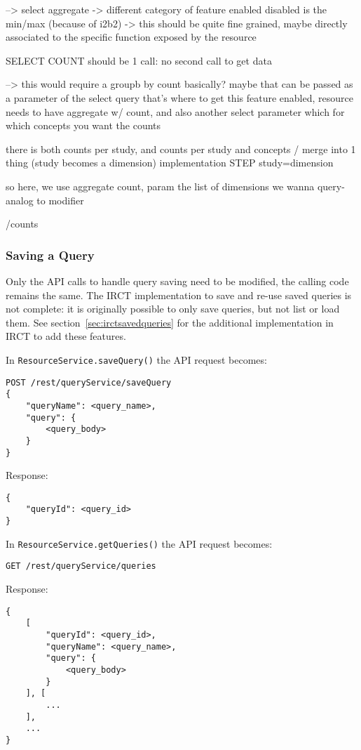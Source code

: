 --> select aggregate
-> different category of feature enabled disabled is the min/max (because of i2b2) -> this should be quite fine grained, maybe directly associated to the specific function exposed by the resource

SELECT COUNT should be 1 call: no second call to get data

--> this would require a groupb by count basically? maybe that can be passed as a parameter of the select query
that's where to get this feature enabled, resource needs to have aggregate w/ count, and also another select parameter which for which concepts you want the counts

there is both counts per study, and counts per study and concepts / merge into 1 thing (study becomes a dimension)
implementation STEP study=dimension

so here, we use aggregate count, param the list of dimensions we wanna query-analog to modifier

/counts

\subsubsection{Saving a Query}
Only the API calls to handle query saving need to be modified, the calling code remains the same.
The IRCT implementation to save and re-use saved queries is not complete: it is originally possible to only save queries, but not list or load them. 
See section~\ref{sec:irctsavedqueries} for the additional implementation in IRCT to add these features.

In \verb|ResourceService.saveQuery()| the API request becomes:
\begin{verbatim}
POST /rest/queryService/saveQuery
{
    "queryName": <query_name>,
    "query": {
        <query_body>
    }
}    
\end{verbatim}

Response:
\begin{verbatim}
{
    "queryId": <query_id>
}    
\end{verbatim}

In  \verb|ResourceService.getQueries()| the API request becomes:
\begin{verbatim}
GET /rest/queryService/queries
\end{verbatim}

Response:
\begin{verbatim}
{
    [
        "queryId": <query_id>,
        "queryName": <query_name>,
        "query": {
            <query_body>
        }
    ], [
        ...
    ],
    ...
}    
\end{verbatim}

